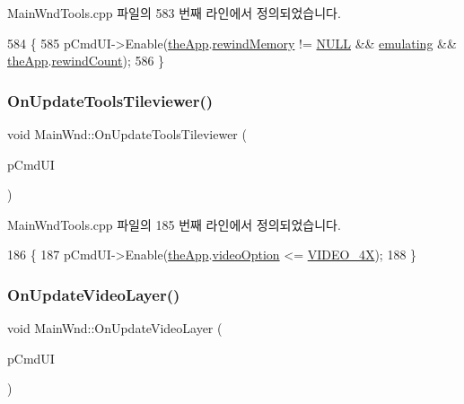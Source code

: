 Main\+Wnd\+Tools.\+cpp 파일의 583 번째 라인에서 정의되었습니다.


\begin{DoxyCode}
584 \{
585   pCmdUI->Enable(\mbox{\hyperlink{_v_b_a_8cpp_a8095a9d06b37a7efe3723f3218ad8fb3}{theApp}}.\mbox{\hyperlink{class_v_b_a_ad2f4e21586cc185a1e6525080532471a}{rewindMemory}} != \mbox{\hyperlink{getopt1_8c_a070d2ce7b6bb7e5c05602aa8c308d0c4}{NULL}} && \mbox{\hyperlink{_main_wnd_tools_8cpp_af9cc36078b1b311753963297ae7f2a74}{emulating}} && 
      \mbox{\hyperlink{_v_b_a_8cpp_a8095a9d06b37a7efe3723f3218ad8fb3}{theApp}}.\mbox{\hyperlink{class_v_b_a_a39430ba84d3e7205846e24f0484d7880}{rewindCount}});
586 \}
\end{DoxyCode}
\mbox{\label{class_main_wnd_a980070c28374d525e43990697d3b10fd}} 
\subsubsection{\texorpdfstring{On\+Update\+Tools\+Tileviewer()}{OnUpdateToolsTileviewer()}}
{\footnotesize\ttfamily void Main\+Wnd\+::\+On\+Update\+Tools\+Tileviewer (\begin{DoxyParamCaption}\item[{C\+Cmd\+UI $\ast$}]{p\+Cmd\+UI }\end{DoxyParamCaption})\hspace{0.3cm}{\ttfamily [protected]}}



Main\+Wnd\+Tools.\+cpp 파일의 185 번째 라인에서 정의되었습니다.


\begin{DoxyCode}
186 \{
187   pCmdUI->Enable(\mbox{\hyperlink{_v_b_a_8cpp_a8095a9d06b37a7efe3723f3218ad8fb3}{theApp}}.\mbox{\hyperlink{class_v_b_a_a17dac073149c897f770c00ed7098ad32}{videoOption}} <= \mbox{\hyperlink{_v_b_a_8h_a531c35e38ede3ea4e5ba5afb24b29493a6468bce6b84e6350d3de126f257eb38d}{VIDEO\_4X}});  
188 \}
\end{DoxyCode}
\mbox{\label{class_main_wnd_a559482a80b53127046816f476257cbc7}} 
\subsubsection{\texorpdfstring{On\+Update\+Video\+Layer()}{OnUpdateVideoLayer()}}
{\footnotesize\ttfamily void Main\+Wnd\+::\+On\+Update\+Video\+Layer (\begin{DoxyParamCaption}\item[{C\+Cmd\+UI $\ast$}]{p\+Cmd\+UI }\end{DoxyParamCaption})}



